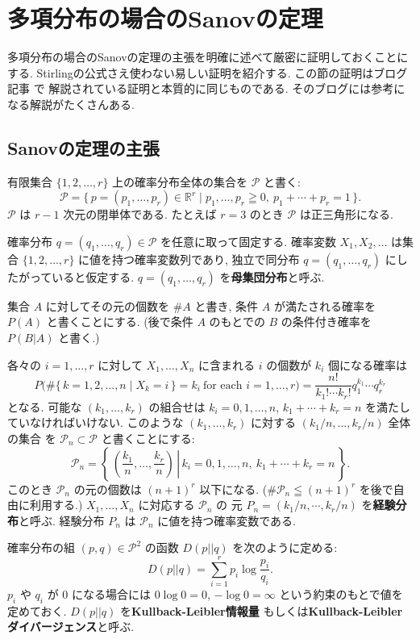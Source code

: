 \documentclass[12pt,twoside]{jarticle}
\newcommand\R{{\mathbb R}} %
\newcommand\cP{{\mathcal P}}
\theoremstyle{jplain}
\theoremstyle{jplain}
\theoremstyle{jplain}
\numberwithin{theorem}{section}
\numberwithin{equation}{section}
\numberwithin{figure}{section}
\numberwithin{table}{section}
\begin{document}
\section{多項分布の場合のSanovの定理}
\label{sec:Sanov}

多項分布の場合のSanovの定理の主張を明確に述べて厳密に証明しておくことにする.
Stirlingの公式さえ使わない易しい証明を紹介する.
この節の証明はブログ記事 \cite{vanRamon2013} で
解説されている証明と本質的に同じものである.
そのブログには参考になる解説がたくさんある.


\subsection{Sanovの定理の主張}


有限集合 $\{1,2,\ldots,r\}$ 上の確率分布全体の集合を $\cP$ と書く:
\[
\cP = \{\,p=(p_1,\ldots,p_r)\in\R^r\mid p_1,\ldots,p_r\geqq 0,\ p_1+\cdots+p_r=1 \,\}.
\]
$\cP$ は $r-1$ 次元の閉単体である.
たとえば $r=3$ のとき $\cP$ は正三角形になる.

確率分布 $q=(q_1,\ldots,q_r)\in\cP$ を任意に取って固定する.
確率変数 $X_1,X_2,\ldots$ は集合 $\{1,2,\ldots,r\}$ に値を持つ確率変数列であり,
独立で同分布 $q=(q_1,\ldots,q_r)$ にしたがっていると仮定する.
$q=(q_1,\ldots,q_r)$ を{\bfseries 母集団分布}と呼ぶ.

集合 $A$ に対してその元の個数を $\# A$ と書き,
条件 $A$ が満たされる確率を $P(A)$ と書くことにする.
(後で条件 $A$ のもとでの $B$ の条件付き確率を $P(B|A)$ と書く.)

各々の $i=1,\ldots,r$ に対して
$X_1,\ldots,X_n$ に含まれる $i$ の個数が $k_i$ 個になる確率は
\[
P\biggl(
\#\{\,k=1,2,\ldots,n\mid X_k=i\,\}=k_i\ \text{for each $i=1,\ldots,r$}
\biggr)
=
\frac{n!}{k_1!\cdots k_r!}q_1^{k_1}\cdots q_r^{k_r}
\]
となる. 可能な $(k_1,\ldots,k_r)$ の組合せは
$k_i=0,1,\ldots,n$, $k_1+\cdots+k_r=n$ を満たしていなければいけない.
このような $(k_1,\ldots,k_r)$ に対する $(k_1/n,\ldots,k_r/n)$ 全体の集合
を $\cP_n\subset\cP$ と書くことにする:
\[
\cP_n =
\left\{\left.\,\left(\frac{k_1}{n},\ldots,\frac{k_r}{n}\right)
\,\right|\,
k_i=0,1,\ldots,n,\ k_1+\cdots+k_r=n
\,\right\}.
\]
このとき $\cP_n$ の元の個数は $(n+1)^r$ 以下になる.
($\#\cP_n\leqq(n+1)^r$ を後で自由に利用する.)
$X_1,\ldots,X_n$ に対応する $\cP_n$ の
元 $P_n=(k_1/n,\cdots,k_r/n)$ を{\bfseries 経験分布}と呼ぶ.
経験分布 $P_n$ は $\cP_n$ に値を持つ確率変数である.

確率分布の組 $(p,q)\in\cP^2$ の函数 $D(p||q)$ を次のように定める:
\[
D(p||q)=\sum_{i=1}^r p_i\log\frac{p_i}{q_i}.
\]
$p_i$ や $q_i$ が $0$ になる場合には $0\log 0=0$, $-\log 0=\infty$
という約束のもとで値を定めておく.
$D(p||q)$ を{\bfseries Kullback-Leibler情報量}
もしくは{\bfseries Kullback-Leiblerダイバージェンス}と呼ぶ.
\end{document}
